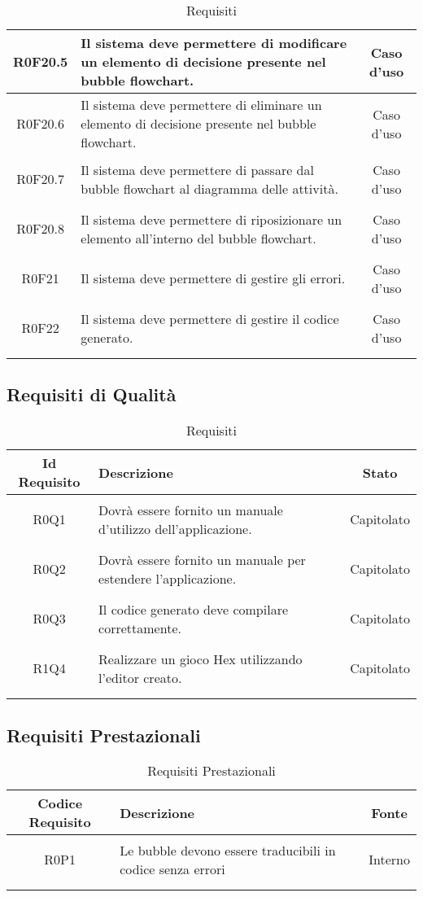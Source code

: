 \documentclass[../AnalisiDeiRequisiti.tex]{subfiles}
\begin{document}
\begin{longtable}{|c|>{\centering}p{7cm}|c|}
\hypertarget{R0F20.5}{R0F20.5} & Il sistema deve permettere di modificare un elemento di decisione presente nel bubble flowchart. & Caso d'uso \\ \hline
\hypertarget{R0F20.6}{R0F20.6} & Il sistema deve permettere di eliminare un elemento di decisione presente nel bubble flowchart. & Caso d'uso \\ \hline
\hypertarget{R0F20.7}{R0F20.7} & Il sistema deve permettere di passare dal bubble flowchart al diagramma delle attività. & Caso d'uso \\ \hline
\hypertarget{R0F20.8}{R0F20.8} & Il sistema deve permettere di riposizionare un elemento all'interno del bubble flowchart. & Caso d'uso \\ \hline
\hypertarget{R0F21}{R0F21} & Il sistema deve permettere di gestire gli errori. & Caso d'uso \\ \hline
\hypertarget{R0F22}{R0F22} & Il sistema deve permettere di gestire il codice generato. & Caso d'uso \\ \hline
\caption[Requisiti]{Requisiti}
\label{tabella:req0}
\end{longtable}
\clearpage
\subsection{Requisiti di Qualità}
\normalsize
\begin{longtable}{|c|>{\centering}p{7cm}|c|}
	\hline
	\textbf{Id Requisito} & \textbf{Descrizione} & \textbf{Stato}\\
	\hline
	\endhead
	\hypertarget{R0Q1}{R0Q1} & Dovrà essere fornito un manuale d'utilizzo dell'applicazione. & Capitolato \\ \hline
	\hypertarget{R0Q2}{R0Q2} & Dovrà essere fornito un manuale per estendere l'applicazione. & Capitolato \\ \hline
	\hypertarget{R0Q3}{R0Q3} & Il codice generato deve compilare correttamente. & Capitolato \\ \hline
	\hypertarget{R1Q4}{R1Q4} & Realizzare un gioco Hex utilizzando l'editor creato. & Capitolato \\ \hline
	\caption[Requisiti]{Requisiti}
	\label{tabella:req1}
\end{longtable}
\clearpage
\subsection{Requisiti Prestazionali}
\normalsize
\begin{longtable}{|c|>{\centering}p{7cm}|c|}
	\hline
	\textbf{Codice Requisito} & \textbf{Descrizione} & \textbf{Fonte}\\
	\hline
	\endhead
	\hypertarget{R0P1}{R0P1} & Le bubble devono essere traducibili in codice senza errori & Interno \\ \hline
	\caption[Requisiti Prestazionali]{Requisiti Prestazionali}
	\label{tabella:req2}
\end{longtable}
\clearpage
\end{document}
